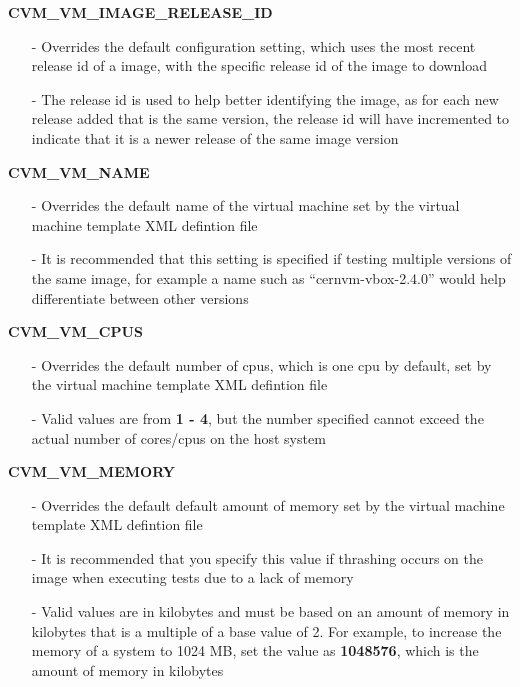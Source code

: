 \begin{description}
\item {\bf CVM\_VM\_IMAGE\_RELEASE\_ID}
		\begin{itemize}
		\item[-]	Overrides the default configuration setting, which uses the most recent
				release id of a \cernvm image, with the specific release id of the 
				\cernvm image to download
		\item[-]	The release id is used to help better identifying the image, as for each new
				release added that is the same version, the release id will have incremented
				to indicate that it is a newer release of the same image version
		\end{itemize}
		
\item {\bf CVM\_VM\_NAME}
		\begin{itemize}
		\item[-]	Overrides the default name of the virtual machine set by the 
				virtual machine template XML defintion file
		\item[-]	It is recommended that this setting is specified if testing multiple
				versions of the same \cernvm image, for example a name such as
				``cernvm-vbox-2.4.0'' would help differentiate between other versions
		\end{itemize}
		
\item {\bf CVM\_VM\_CPUS}
		\begin{itemize}
		\item[-]	Overrides the default number of cpus, which is one cpu by default,
				set by the virtual machine template XML defintion file
		\item[-]	Valid values are from {\bf 1 - 4}, but the number specified cannot
				exceed the actual number of cores/cpus on the host system
		\end{itemize}
	
\item {\bf CVM\_VM\_MEMORY}
		\begin{itemize}
		\item[-]	Overrides the default default amount of memory set by the virtual machine
				template XML defintion file
		\item[-]	It is recommended that you specify this value if thrashing occurs on the
				\cernvm image when executing tests due to a lack of memory
		\item[-]	Valid values are in kilobytes and must be based on an amount of memory in
				kilobytes that is a multiple of a base value of 2. For example, to increase
				the memory of a system to 1024 MB, set the value as {\bf 1048576}, which is the
				amount of memory in kilobytes
		\end{itemize}
		

\end{description}
